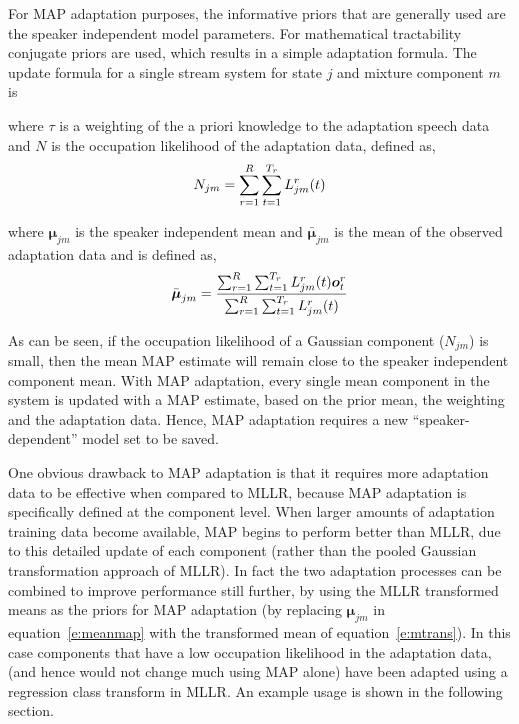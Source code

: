 For MAP adaptation purposes, the informative priors that are generally
used are the speaker independent model parameters. For mathematical
tractability conjugate priors are used, which results in a simple
adaptation formula. The update formula for a 
single stream system for state $j$ and mixture component $m$ is


where $\tau$ is a weighting of the a priori knowledge to the
adaptation speech data and $N$ is the occupation likelihood of the
adaptation data, defined as,
\[
   N_{jm} = \sum_{r=1}^R \sum_{t=1}^{T_r} L^r_{jm}(t)
\]

where $\bm{\mu}_{jm}$ is the speaker independent mean 
and $\bar{\bm{\mu}}_{jm}$ is the mean of the observed adaptation
data and is defined as,
\[
   \bar{{\mbox{\boldmath $\mu$}}}_{jm} = \frac{
                \sum_{r=1}^R \sum_{t=1}^{T_r} L^r_{jm}(t){\mbox{\boldmath $o$}}^r_{t}}{\sum_{r=1}^R \sum_{t=1}^{T_r} L^r_{jm}(t)}
\]

As can be seen, if the occupation likelihood
of a Gaussian component ($N_{jm}$) is small, then the
mean MAP estimate will remain close to the speaker
independent component mean. 
With MAP adaptation, every single mean
component in the system is updated with a MAP estimate, based on the
prior mean, the weighting and the adaptation data. Hence, MAP
adaptation requires a new ``speaker-dependent'' model set to be saved.

One obvious drawback to MAP adaptation is that it requires more
adaptation data to be effective when compared to MLLR, because MAP
adaptation is specifically defined at the component level. When
larger amounts of adaptation training data become available, MAP
begins to perform better than MLLR, due to this detailed update of
each component (rather than the pooled Gaussian transformation
approach of MLLR). In fact the two adaptation processes can be
combined to improve performance still further, by using the MLLR
transformed means as the priors for MAP adaptation (by replacing
$\bm{\mu}_{jm}$ in equation~\ref{e:meanmap} with the transformed mean
of equation~\ref{e:mtrans}). In this case
components that have a low occupation likelihood in the adaptation
data, (and hence would not change much using MAP alone) have been
adapted using a regression class transform in MLLR. An example usage
is shown in the following section. 



